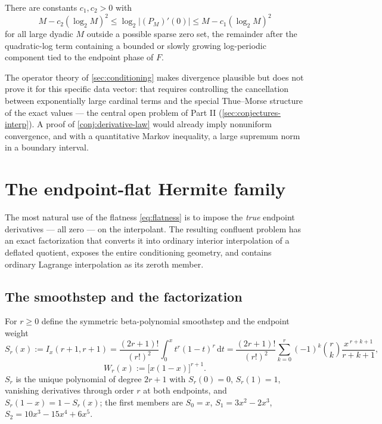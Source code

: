 \documentclass[11pt,oneside]{article}
\numberwithin{equation}{section}
\theoremstyle{definition}
\theoremstyle{remark}
\newcommand{\dd}{\,\mathrm d}
\newcommand{\abs}[1]{\left\lvert #1\right\rvert}
\begin{document}
\begin{conjecture}
\label{conj:derivative-law}
There are constants $c_1,c_2>0$ with
\begin{equation}
 M-c_2(\log_2M)^{2}
 \le\log_2\abs{(P_M)'(0)}
 \le M-c_1(\log_2M)^{2}
 \label{eq:derivative-conjecture}
\end{equation}
for all large dyadic $M$ outside a possible sparse zero set, the
remainder after the quadratic-log term containing a bounded or slowly
growing log-periodic component tied to the endpoint phase of $F$.
\end{conjecture}

The operator theory of \cref{sec:conditioning} makes divergence
plausible but does not prove it for this specific data vector: that
requires controlling the cancellation between exponentially large
cardinal terms and the special Thue--Morse structure of the exact
values --- the central open problem of Part II
(\cref{sec:conjectures-interp}).  A proof of
\cref{conj:derivative-law} would already imply nonuniform convergence,
and with a quantitative Markov inequality, a large supremum norm in a
boundary interval.

\section{The endpoint-flat Hermite family}
\label{sec:endpoint-flat}

The most natural use of the flatness \eqref{eq:flatness} is to impose
the \emph{true} endpoint derivatives --- all zero --- on the
interpolant.  The resulting confluent problem has an exact
factorization that converts it into ordinary interior interpolation of
a deflated quotient, exposes the entire conditioning geometry, and
contains ordinary Lagrange interpolation as its zeroth member.

\subsection{The smoothstep and the factorization}

For $r\ge0$ define the symmetric beta-polynomial smoothstep and the
endpoint weight
\begin{equation}
 S_r(x):=I_x(r+1,r+1)
 =\frac{(2r+1)!}{(r!)^{2}}\int_0^{x}t^{r}(1-t)^{r}\dd t
 =\frac{(2r+1)!}{(r!)^{2}}
 \sum_{k=0}^{r}(-1)^{k}\binom rk\frac{x^{\,r+k+1}}{r+k+1},
 \label{eq:smoothstep}
\end{equation}
\begin{equation}
 W_r(x):=\bigl[x(1-x)\bigr]^{r+1}.
 \label{eq:Wr}
\end{equation}
$S_r$ is the unique polynomial of degree $2r+1$ with
$S_r(0)=0$, $S_r(1)=1$, vanishing derivatives through order $r$ at
both endpoints, and $S_r(1-x)=1-S_r(x)$; the first members are
$S_0=x$, $S_1=3x^2-2x^3$, $S_2=10x^3-15x^4+6x^5$.
\end{document}
